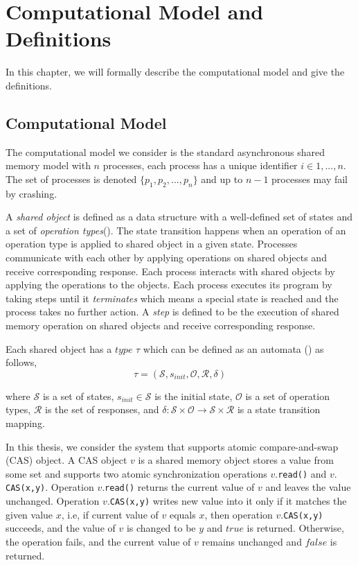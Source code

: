 
\chapter{Computational Model and Definitions}
In this chapter, we will formally describe the computational model and give the definitions.

\section{Computational Model}
The computational model we consider is the standard asynchronous shared memory model with $n$ processes, each process has a unique identifier $i \in {1,...,n}$. The set of processes is denoted $\{p_1, p_2,...,p_n\}$ and up to $n-1$ processes may fail by crashing.

A \emph{shared object} is defined as a data structure with a well-defined set of states and a set of \emph{operation types}(\citep*{birnbaum1969new}). The state transition happens when an operation of an operation type is applied to shared object in a given state. Processes communicate with each other by applying operations on shared objects and receive corresponding response. Each process interacts with shared objects by applying the
operations to the objects. Each process executes its program by taking steps until it \emph{terminates} which means a special state is reached and the process takes no further action. A \emph{step} is defined to be the execution of shared memory operation on shared objects and receive corresponding response. 

Each shared object has a $type$ $\tau$ which can be defined as an automata (\cite{birnbaum1969new}) as follows,
$$\tau = (\mathcal{S}, s_{init},\mathcal{O},\mathcal{R} ,\delta )$$

where $\mathcal{S}$ is a set of states, $s_{init} \in \mathcal{S}$ is the initial state, $\mathcal{O}$ is a set of operation types, $\mathcal{R}$ is the set of responses, and $\delta :\mathcal{S} \times \mathcal{O} \to \mathcal{S} \times \mathcal{R}$ is a state transition mapping. 

In this thesis, we consider the system that supports atomic compare-and-swap (CAS) object. A CAS object $v$ is a shared memory object stores a value from some set and supports two atomic synchronization operations $v.$\texttt{read()} and $v.$\texttt{CAS(x,y)}. Operation $v.$\texttt{read()} returns the current value of $v$ and leaves the value unchanged. Operation $v.$\texttt{CAS(x,y)} writes new value into it only if it matches the given value $x$, i.e, if current value of $v$ equals $x$, then operation $v.$\texttt{CAS(x,y)} succeeds, and the value of $v$ is changed to be $y$ and $true$ is returned. Otherwise, the operation fails, and the current value of $v$ remains unchanged and $false$ is returned.


